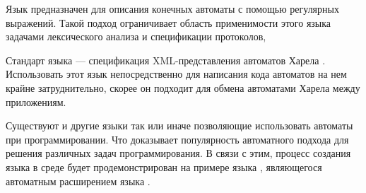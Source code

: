 Язык  предназначен для описания конечных автоматы с помощью регулярных выражений. Такой подход ограничивает область применимости этого языка задачами лексического анализа и спецификации протоколов,

Стандарт языка  --- спецификация XML-представления автоматов Харела \cite{harel}. Использовать этот язык непосредственно для написания кода автоматов на нем крайне затруднительно, скорее он подходит для обмена автоматами Харела между приложениям.

Существуют и другие языки так или иначе позволяющие использовать автоматы при программировании. Что доказывает популярность автоматного подхода для решения различных задач программирования. В связи с этим, процесс создания языка в среде \MPS{} будет продемонстрирован на примере языка , являющегося автоматным расширением языка .
